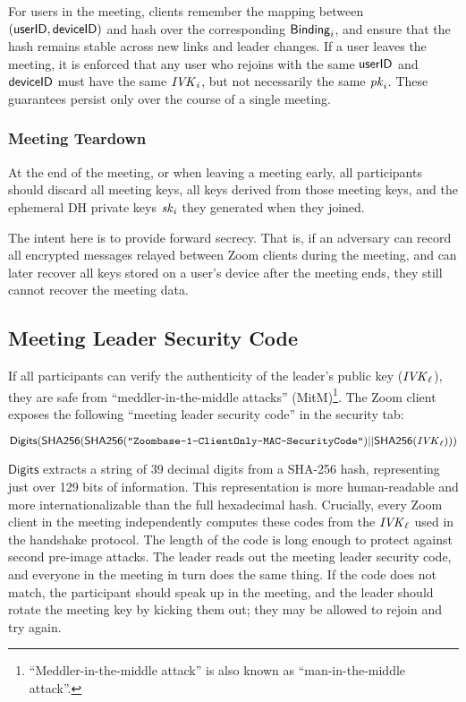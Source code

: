 For users in the meeting, clients remember the mapping between $(\mathsf{userID}, {\sf deviceID})$ and hash over the corresponding ${\sf Binding}_i$, and ensure that the hash remains stable across new links and leader changes. If a user leaves the meeting, it is enforced that any user who rejoins with the same $\mathsf{userID}$ and ${\sf deviceID}$ must have the same $\mathit{IVK}_i$, but not necessarily the same $\mathit{pk}_i$. These guarantees persist only over the course of a single meeting.

\subsubsection{Meeting Teardown}
At the end of the meeting, or when leaving a meeting early, all participants should discard all meeting keys, all keys derived from those meeting keys, and the ephemeral DH private keys $\mathit{sk}_i$ they generated when they joined.

The intent here is to provide forward secrecy. That is, if an adversary can record all encrypted messages relayed between Zoom clients during the meeting, and can later recover all keys stored on a user's device after the meeting ends, they still cannot recover the meeting data.

\subsection{Meeting Leader Security Code}
If all participants can verify the authenticity of the leader's public key ($\mathit{IVK}_{\ell}$), they are safe from ``meddler-in-the-middle attacks'' (MitM)\footnote{``Meddler-in-the-middle attack'' is also known as ``man-in-the-middle attack''.}. The Zoom client exposes the following ``meeting leader security code'' in the security tab:

$$\mathsf{Digits}({\sf SHA256}({\sf SHA256}(\texttt{"Zoombase-1-ClientOnly-MAC-SecurityCode"}) || {\sf SHA256}(\mathit{IVK}_{\ell})))$$

$\mathsf{Digits}$ extracts a string of 39 decimal digits from a SHA-256 hash, representing just over 129 bits of information. This representation is more human-readable and more internationalizable than the full hexadecimal hash. Crucially, every Zoom client in the meeting independently computes these codes from the $\mathit{IVK}_{\ell}$ used in the handshake protocol. The length of the code is long enough to protect against second pre-image attacks. The leader reads out the meeting leader security code, and everyone in the meeting in turn does the same thing. If the code does not match, the participant should speak up in the meeting, and the leader should rotate the meeting key by kicking them out; they may be allowed to rejoin and try again.

